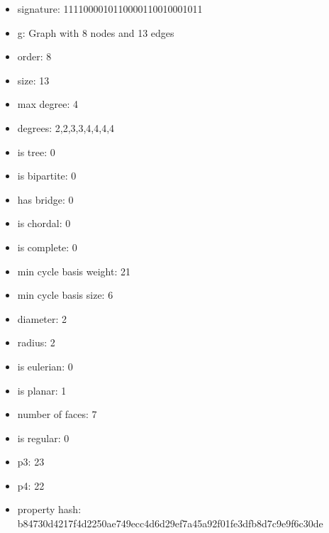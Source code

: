 \begin{itemize}
\item signature: 1111000010110000110010001011
\item g: Graph with 8 nodes and 13 edges
\item order: 8
\item size: 13
\item max degree: 4
\item degrees: 2,2,3,3,4,4,4,4
\item is tree: 0
\item is bipartite: 0
\item has bridge: 0
\item is chordal: 0
\item is complete: 0
\item min cycle basis weight: 21
\item min cycle basis size: 6
\item diameter: 2
\item radius: 2
\item is eulerian: 0
\item is planar: 1
\item number of faces: 7
\item is regular: 0
\item p3: 23
\item p4: 22
\item property hash: b84730d4217f4d2250ae749ecc4d6d29ef7a45a92f01fe3dfb8d7c9e9f6c30de
\end{itemize}
\newpage
\begin{figure}
\end{figure}
